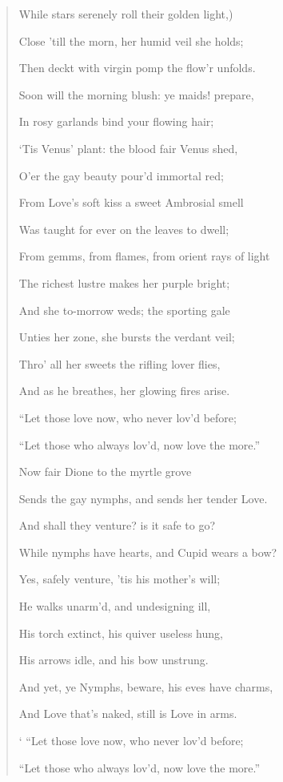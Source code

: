 \documentclass[a4paper, 11pt, oneside, polutonikogreek, english]{article}
\begin{document}
\begin{quotation}
While stars serenely roll their golden light,)

Close 'till the morn, her humid veil she holds;

Then deckt with virgin pomp the flow'r unfolds.

Soon will the morning blush: ye maids! prepare,

In rosy garlands bind your flowing hair;

`Tis Venus' plant: the blood fair Venus shed,

O'er the gay beauty pour'd immortal red;

From Love's soft kiss a sweet Ambrosial smell

Was taught for ever on the leaves to dwell;

From gemms, from flames, from orient rays of light

The richest lustre makes her purple bright;

And she to-morrow weds; the sporting gale

Unties her zone, she bursts the verdant veil;

Thro' all her sweets the rifling lover flies,

And as he breathes, her glowing fires arise.

\hspace*{15mm}``Let those love now, who never lov'd before;

``Let those who always lov'd, now love the more.''

\hspace*{15mm}Now fair Dione to the myrtle grove

Sends the gay nymphs, and sends her tender Love.

And shall they venture? is it safe to go?

While nymphs have hearts, and Cupid wears a bow?

Yes, safely venture, 'tis his mother's will;

He walks unarm'd, and undesigning ill,

His torch extinct, his quiver useless hung,

His arrows idle, and his bow unstrung.

And yet, ye Nymphs, beware, his eves have charms,

And Love that's naked, still is Love in arms.

\hspace*{15mm}` ``Let those love now, who never lov'd before;

``Let those who always lov'd, now love the more.''


\end{quotation}
\end{document}
